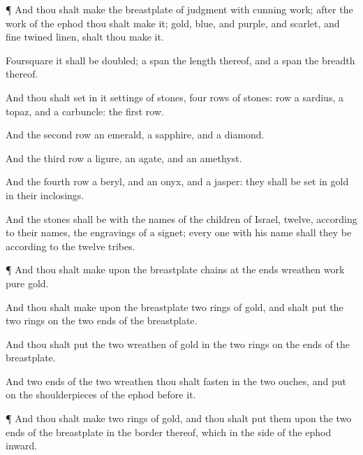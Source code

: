{\par }{\PP {}¶ And thou shalt
make the
breastplate of
judgment with
cunning
work; after the
work of the
ephod thou shalt
make it;
{}
gold,
{}
blue, and
{}
purple, and
{}
scarlet, and
{} fine
twined
linen, shalt thou
make it.

Foursquare it shall be
{}
doubled; a
span
{} the
length thereof, and a
span
{} the
breadth thereof.

And thou shalt
set in it
settings of
stones,
{}
four
rows of
stones:
{}
row
{} a
sardius, a
topaz, and a
carbuncle:
{} the
first
row.

And the
second
row
{} an
emerald, a
sapphire, and a
diamond.

And the
third
row a
ligure, an
agate, and an
amethyst.

And the
fourth
row a
beryl, and an
onyx, and a
jasper: they shall be
set in
gold in their
inclosings.

And the
stones shall be with the
names of the
children of
Israel,
twelve, according to their
names,
{} the
engravings of a
signet; every
one with his
name shall they be according to the
twelve
tribes.


\par }{\PP {}¶ And thou shalt
make upon the
breastplate
chains at the
ends
{}
wreathen
work
{}
pure
gold.

And thou shalt
make upon the
breastplate
two
rings of
gold, and shalt
put the
two
rings on the
two
ends of the
breastplate.

And thou shalt
put the
two
wreathen
{} of
gold in the
two
rings
{} on the
ends of the
breastplate.

And
{}
two
ends of the
two
wreathen
{} thou shalt
fasten in the
two
ouches, and
put
{} on the
shoulderpieces of the
ephod
before
it.


\par }{\PP {}¶ And thou shalt
make
two
rings of
gold, and thou shalt
put them upon the
two
ends of the
breastplate in the
border thereof, which
{} in the
side of the
ephod
inward.

}
